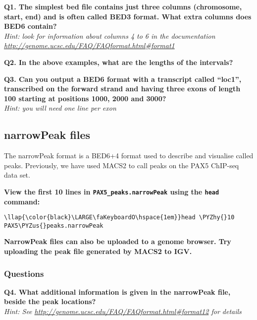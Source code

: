 \documentclass[11pt]{article}
\def\PYZus{\char`\_}
\def\PYZhy{\char`\-}
\begin{document}
\textbf{Q1. The simplest bed file contains just three columns
(chromosome, start, end) and is often called BED3 format. What extra
columns does BED6 contain?}\\
\textit{Hint: look for information about columns 4 to 6 in the
documentation \url{http://genome.ucsc.edu/FAQ/FAQformat.html\#format1}}

\textbf{Q2. In the above examples, what are the lengths of the
intervals?}

\textbf{Q3. Can you output a BED6 format with a transcript called
``loc1'', transcribed on the forward strand and having three exons of
length 100 starting at positions 1000, 2000 and 3000?}\\
\textit{Hint: you will need one line per exon}


\newpage

    \hypertarget{narrowpeak-files}{%
\subsection{narrowPeak files}\label{narrowpeak-files}}

The narrowPeak format is a BED6+4 format used to describe and visualise
called peaks. Previously, we have used MACS2 to call peaks on the PAX5
ChIP-seq data set.

    \textbf{View the first 10 lines in \texttt{PAX5\_peaks.narrowPeak} using
the \texttt{head} command:}





\begin{terminalinput}
\begin{Verbatim}[commandchars=\\\{\}]
\llap{\color{black}\LARGE\faKeyboardO\hspace{1em}}head \PYZhy{}10 PAX5\PYZus{}peaks.narrowPeak
\end{Verbatim}
\end{terminalinput}



    \textbf{NarrowPeak files can also be uploaded to a genome
browser. Try uploading the peak file generated by MACS2 to IGV.}

    \hypertarget{questions}{%
\subsubsection{Questions}\label{questions}}

\textbf{Q4. What additional information is given in the narrowPeak file,
beside the peak locations?}\\
\textit{Hint: See
\url{http://genome.ucsc.edu/FAQ/FAQformat.html\#format12} for details}
\end{document}
